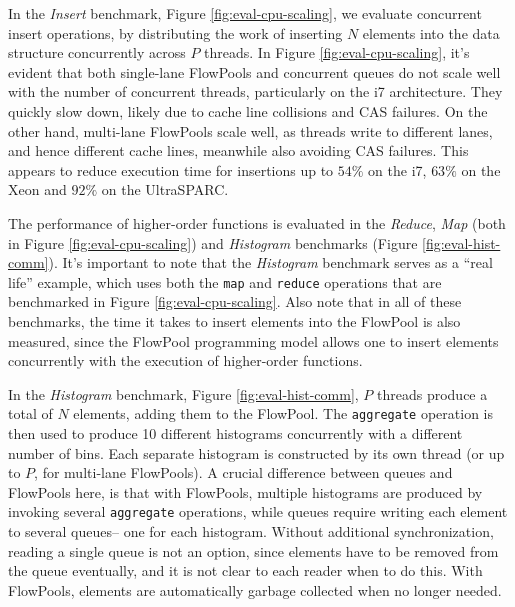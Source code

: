 In the \emph{Insert} benchmark, Figure \ref{fig:eval-cpu-scaling},
we evaluate concurrent insert operations, by distributing the
work of inserting $N$ elements into the data structure concurrently
across $P$ threads.
In Figure \ref{fig:eval-cpu-scaling}, it's evident that both single-lane FlowPools and concurrent queues do
not scale well with the number of concurrent threads, particularly
on the i7 architecture. They quickly slow down, likely due to cache
line collisions and CAS failures.
On the other hand, multi-lane FlowPools scale well, as threads
write to different lanes, and hence different cache lines,
meanwhile also avoiding CAS failures. This appears to reduce execution
time for insertions up to $54\%$ on the i7, $63\%$ on the
Xeon and $92\%$ on the UltraSPARC.

The performance of higher-order functions is evaluated in the \emph{Reduce},
\emph{Map} (both in Figure \ref{fig:eval-cpu-scaling}) and \emph{Histogram}
benchmarks (Figure \ref{fig:eval-hist-comm}).  It's important to note that the
\emph{Histogram} benchmark serves as a ``real life'' example, which uses both
the \verb=map= and \verb=reduce= operations that are benchmarked in Figure
\ref{fig:eval-cpu-scaling}. Also note that in all of these benchmarks, the
time it takes to insert elements into the FlowPool is also measured, since the
FlowPool programming model allows one to insert elements concurrently with the
execution of higher-order functions.

In the \textit{Histogram} benchmark, Figure \ref{fig:eval-hist-comm}, $P$ threads produce a total of
$N$ elements, adding them to the FlowPool.
The \verb=aggregate= operation is then used to produce 10 different
histograms concurrently with a different number of bins.
Each separate histogram is constructed by its own thread (or up to
$P$, for multi-lane FlowPools).
A crucial difference between queues and FlowPools here, is that with
FlowPools, multiple histograms are produced
by invoking several \verb=aggregate= operations, while queues require
writing each element to several queues-- one for each histogram.
Without additional synchronization, reading a single queue is not an
option, since elements have to be removed from the queue eventually, and
it is not clear to each reader when to do this.
With FlowPools, elements are automatically garbage collected when no
longer needed.

